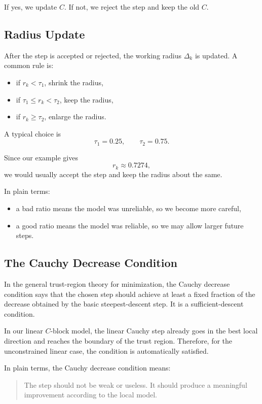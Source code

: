 \documentclass{article}
\begin{document}
If yes, we update $C$. If not, we reject the step and keep the old $C$.

\subsection{Radius Update}

After the step is accepted or rejected, the working radius $\Delta_k$ is updated. A common rule is:
\begin{itemize}
    \item if $r_k < \tau_1$, shrink the radius,
    \item if $\tau_1 \leq r_k < \tau_2$, keep the radius,
    \item if $r_k \geq \tau_2$, enlarge the radius.
\end{itemize}

A typical choice is
\begin{equation}
 \tau_1 = 0.25,
 \qquad
 \tau_2 = 0.75.
\end{equation}

Since our example gives
\begin{equation}
 r_k \approx 0.7274,
\end{equation}
we would usually accept the step and keep the radius about the same.

In plain terms:
\begin{itemize}
    \item a bad ratio means the model was unreliable, so we become more careful,
    \item a good ratio means the model was reliable, so we may allow larger future steps.
\end{itemize}

\subsection{The Cauchy Decrease Condition}

In the general trust-region theory for minimization, the Cauchy decrease condition says that the chosen step should achieve at least a fixed fraction of the decrease obtained by the basic steepest-descent step. It is a sufficient-descent condition.

In our linear $C$-block model, the linear Cauchy step already goes in the best local direction and reaches the boundary of the trust region. Therefore, for the unconstrained linear case, the condition is automatically satisfied.

In plain terms, the Cauchy decrease condition means:
\begin{quote}
The step should not be weak or useless. It should produce a meaningful improvement according to the local model.
\end{quote}
\end{document}
